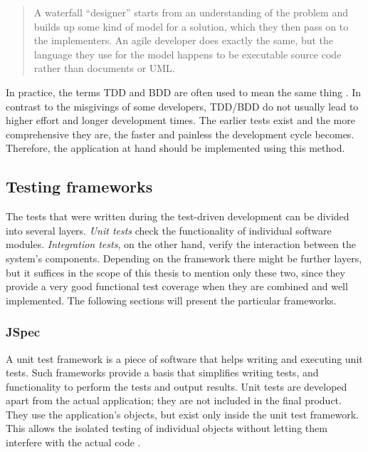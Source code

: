 \begin{quote}
A waterfall \enquote{designer} starts from an understanding of the problem and builds up some kind of model for a solution, which they then pass on to the implementers. An agile developer does exactly the same, but the language they use for the model happens to be executable source code rather than documents or UML. 
\end{quote}

In practice, the terms TDD and BDD are often used to mean the same thing \cite{bdd:tdd}. In contrast to the misgivings of some developers, TDD/BDD do not usually lead to higher effort and longer development times. The earlier tests exist and the more comprehensive they are, the faster and painless the development cycle becomes. Therefore, the application at hand should be implemented using this method.


\subsection{Testing frameworks}
\label{subsec:testframe}

The tests that were written during the test-driven development can be divided into several layers. \textit{Unit tests} check the functionality of individual software modules. \textit{Integration tests}, on the other hand, verify the interaction between the system's components. Depending on the framework there might be further layers, but it suffices in the scope of this thesis to mention only these two, since they provide a very good functional test coverage when they are combined and well implemented. The following sections will present the particular frameworks.


\subsubsection{JSpec}
\label{subsec:jspec}

A unit test framework is a piece of software that helps writing and executing unit tests. Such frameworks provide a basis that simplifies writing tests, and functionality to perform the tests and output results. Unit tests are developed apart from the actual application; they are not included in the final product. They use the application's objects, but exist only inside the unit test framework. This allows the isolated testing of individual objects without letting them interfere with the actual code .

